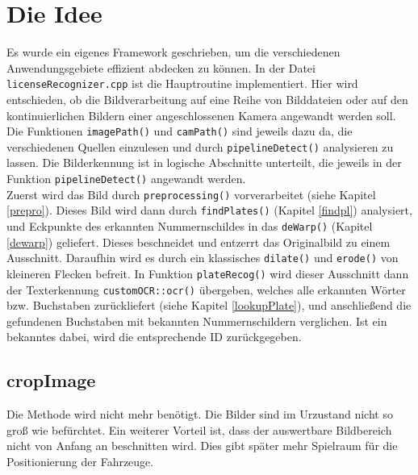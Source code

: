 \documentclass{../Vorlage/sebDenCls}
\begin{document}

\section{Die Idee}
Es wurde ein eigenes Framework geschrieben, um die verschiedenen Anwendungsgebiete effizient abdecken zu können. In der Datei \texttt{licenseRecognizer.cpp} ist die Hauptroutine implementiert.
Hier wird entschieden, ob die Bildverarbeitung auf eine Reihe von Bilddateien oder auf den kontinuierlichen Bildern einer angeschlossenen Kamera angewandt werden soll.
Die Funktionen \texttt{imagePath()} und \texttt{camPath()} sind jeweils dazu da, die verschiedenen Quellen einzulesen und durch \texttt{pipelineDetect()} analysieren zu lassen. Die Bilderkennung ist in logische Abschnitte unterteilt, die jeweils in der Funktion \texttt{pipelineDetect()} angewandt werden.\\
Zuerst wird das Bild durch \texttt{preprocessing()} vorverarbeitet (siehe Kapitel \ref{prepro}). Dieses Bild wird dann durch \texttt{findPlates()} (Kapitel \ref{findpl}) analysiert, und Eckpunkte des erkannten Nummernschildes in das \texttt{deWarp()} (Kapitel \ref{dewarp}) geliefert. Dieses beschneidet und entzerrt das Originalbild zu einem Ausschnitt. Daraufhin wird es durch ein klassisches \texttt{dilate()} und \texttt{erode()} von kleineren Flecken befreit. In Funktion \texttt{plateRecog()} wird dieser Ausschnitt dann der Texterkennung \texttt{customOCR::ocr()} übergeben, welches alle erkannten Wörter bzw. Buchstaben zurückliefert (siehe Kapitel \ref{lookupPlate}), und anschließend die gefundenen Buchstaben mit bekannten Nummernschildern verglichen. Ist ein bekanntes dabei, wird die entsprechende ID zurückgegeben.

\subsection{cropImage}
Die Methode wird nicht mehr benötigt. Die Bilder sind im Urzustand nicht so groß wie befürchtet. Ein weiterer Vorteil ist, dass der auswertbare Bildbereich nicht von Anfang an beschnitten wird. Dies gibt später mehr Spielraum für die Positionierung der Fahrzeuge.
\end{document}
